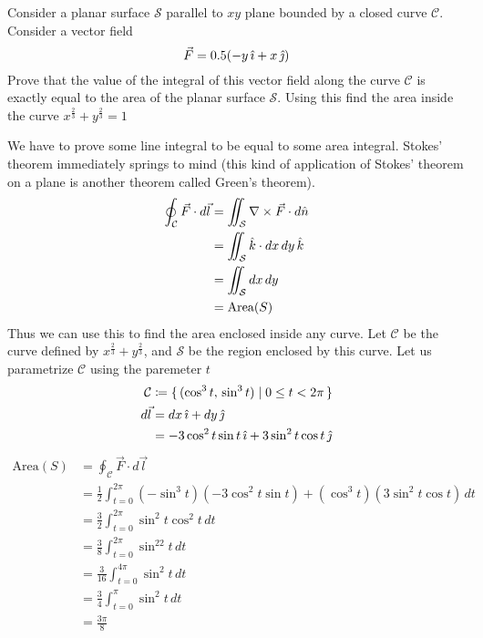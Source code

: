 \documentclass[../main.tex]{subfiles}
\begin{document}
\begin{questions}

\question Consider a planar surface $\mathcal{S}$ parallel to $xy$ plane bounded by a closed curve $\mathcal{C}$. Consider a vector field
\begin{equation*}
	\vec{F} = 0.5(-y\,\hat{\imath} + x\,\hat{\jmath})
\end{equation*}
Prove that the value of the integral of this vector field along the curve $\mathcal{C}$ is exactly equal to the area of the planar surface $\mathcal{S}$. Using this find the area inside the curve $x^{\frac{2}{3}}+y^{\frac{2}{3}}=1$

\begin{solution}
	We have to prove some line integral to be equal to some area integral. Stokes' theorem immediately springs to mind (this kind of application of Stokes' theorem on a plane is another theorem called Green's theorem).
	\begin{align}
		\oint_\mathcal{C} \vec{F}\cdot d\vec{l} &= \iint_\mathcal{S} \nabla\times\vec{F}\cdot d\hat{n}\\
		&= \iint_\mathcal{S} \hat{k} \cdot dx\,dy\,\hat{k}\\
		&= \iint_\mathcal{S} dx\,dy\\
		&= \text{Area}(S)\\
	\end{align}
	Thus we can use this to find the area enclosed inside any curve. Let $\mathcal{C}$ be the curve defined by $x^{\frac{2}{3}}+y^{\frac{2}{3}}$, and $\mathcal{S}$ be the region enclosed by this curve. Let us parametrize $\mathcal{C}$ using the paremeter $t$
	\begin{align}
		\mathcal{C} &\coloneqq \{\,(\cos^3t,\,\sin^3t)\mid0 \leq t < 2\pi\,\}\\
		d\vec{l} &= dx\,\hat{\imath} + dy\,\hat{\jmath}\\
		&= -3\cos^2t\sin t\,\hat{\imath} + 3\sin^2t\cos t\,\hat{\jmath}
	\end{align}
	\begin{align}
		\text{Area}(S) &= \oint_\mathcal{C} \vec{F}\cdot d\vec{l}\\
		&=\frac{1}{2}\int_{t=0}^{2\pi} (-\sin^3t) (-3\cos^2t\sin t) + (\cos^3t)(3\sin^2t\cos t)\,dt\\
		&=\frac{3}{2}\int_{t=0}^{2\pi} \sin^2t\cos^2t\,dt\\
		&=\frac{3}{8}\int_{t=0}^{2\pi} \sin^22t\,dt\\
		&=\frac{3}{16}\int_{t=0}^{4\pi} \sin^2t\,dt\\
		&=\frac{3}{4}\int_{t=0}^{\pi} \sin^2t\,dt\\
		&= \frac{3\pi}{8}
	\end{align}
\end{solution}


\end{questions}
\end{document}
